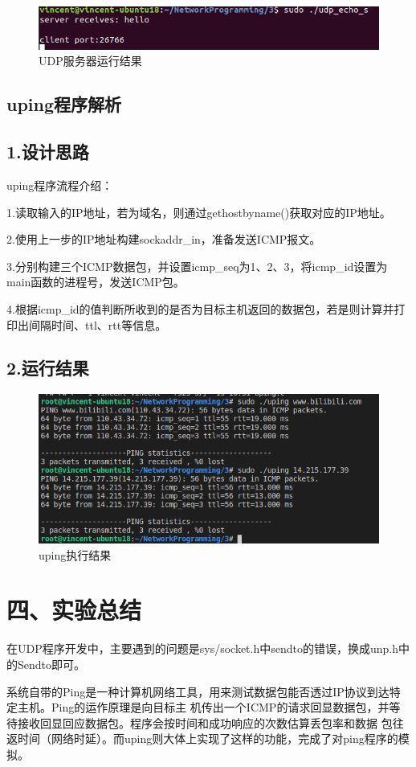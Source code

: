 \documentclass[UTF8]{ctexart}
\begin{document}
\begin{figure}[H]
\includegraphics[width=\textwidth]{pic/udp_server.PNG}
\caption{UDP服务器运行结果}
\end{figure}

\par

\subsection*{\textbf{uping程序解析}}
\subsection*{1.设计思路}
uping程序流程介绍：

1.读取输入的IP地址，若为域名，则通过gethostbyname()获取对应的IP地址。

2.使用上一步的IP地址构建sockaddr\_in，准备发送ICMP报文。

3.分别构建三个ICMP数据包，并设置icmp\_seq为1、2、3，将icmp\_id设置为main函数的进程号，发送ICMP包。

4.根据icmp\_id的值判断所收到的是否为目标主机返回的数据包，若是则计算并打印出间隔时间、ttl、rtt等信息。

\subsection*{2.运行结果}

\begin{figure}[H]
\includegraphics[width=\textwidth]{pic/uping.png}
\caption{uping执行结果}
\end{figure}

\section*{四、实验总结}
在UDP程序开发中，主要遇到的问题是sys/socket.h中sendto的错误，换成unp.h中的Sendto即可。

系统自带的Ping是一种计算机网络工具，用来测试数据包能否透过IP协议到达特定主机。Ping的运作原理是向目标主
机传出一个ICMP的请求回显数据包，并等待接收回显回应数据包。程序会按时间和成功响应的次数估算丢包率和数据
包往返时间（网络时延）。而uping则大体上实现了这样的功能，完成了对ping程序的模拟。
\end{document}
